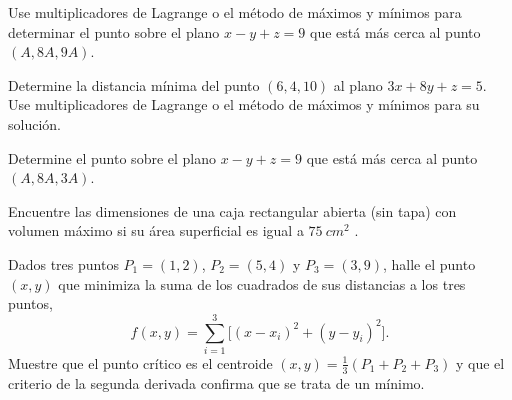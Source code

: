 \begin{prob}
Use multiplicadores de Lagrange o el método de máximos y mínimos para determinar el punto sobre el plano $x-y+z=9$ que está más cerca al punto $(A,8A,9A).$
\end{prob}


\begin{prob}
Determine la distancia mínima del punto $(6,4,10)$ al plano $3x+8y+z=5.$  Use multiplicadores de Lagrange o el método de máximos y mínimos para su solución.
\end{prob}

\begin{prob}
Determine el punto sobre el plano $x-y+z=9$ que está más cerca al punto $(A,8A,3A).$
\end{prob}

\begin{prob}
Encuentre las dimensiones de una caja rectangular abierta (sin tapa) con volumen máximo si su área superficial es igual a $75\ cm^2$ .
\end{prob}

\begin{prob}
Dados tres puntos $P_1=(1,2)$, $P_2=(5,4)$ y $P_3=(3,9)$, halle el punto
$(x,y)$ que minimiza la suma de los cuadrados de sus distancias a los tres
puntos,
\[
f(x,y)=\sum_{i=1}^{3}\bigl[(x-x_i)^2+(y-y_i)^2\bigr].
\]
Muestre que el punto crítico es el centroide
$(x,y)=\tfrac13(P_1+P_2+P_3)$ y que el criterio de la segunda derivada
confirma que se trata de un mínimo.
\end{prob}

